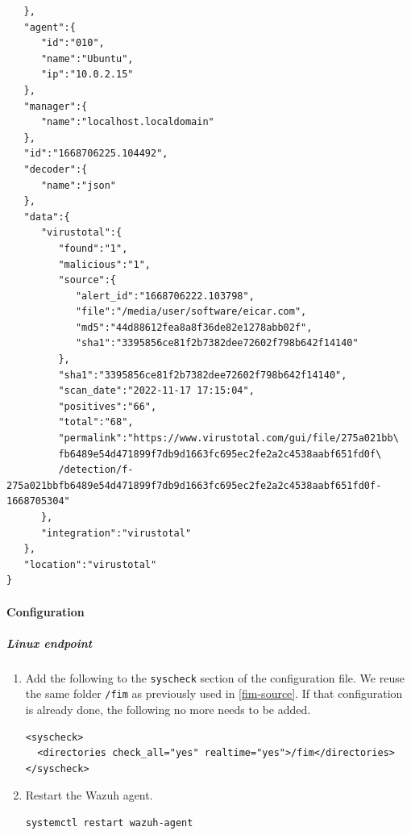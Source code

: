 \begin{enumerate}
\begin{itemize}
\begin{verbatim}
   },
   "agent":{
      "id":"010",
      "name":"Ubuntu",
      "ip":"10.0.2.15"
   },
   "manager":{
      "name":"localhost.localdomain"
   },
   "id":"1668706225.104492",
   "decoder":{
      "name":"json"
   },
   "data":{
      "virustotal":{
         "found":"1",
         "malicious":"1",
         "source":{
            "alert_id":"1668706222.103798",
            "file":"/media/user/software/eicar.com",
            "md5":"44d88612fea8a8f36de82e1278abb02f",
            "sha1":"3395856ce81f2b7382dee72602f798b642f14140"
         },
         "sha1":"3395856ce81f2b7382dee72602f798b642f14140",
         "scan_date":"2022-11-17 17:15:04",
         "positives":"66",
         "total":"68",
         "permalink":"https://www.virustotal.com/gui/file/275a021bb\
         fb6489e54d471899f7db9d1663fc695ec2fe2a2c4538aabf651fd0f\
         /detection/f-275a021bbfb6489e54d471899f7db9d1663fc695ec2fe2a2c4538aabf651fd0f-1668705304"
      },
      "integration":"virustotal"
   },
   "location":"virustotal"
}
    \end{verbatim}
    \end{itemize}
\end{enumerate}

\paragraph{Configuration}
\subparagraph{Linux endpoint}
\begin{enumerate}
    \item Add the following to the \texttt{\textlangle syscheck\textrangle} section of the configuration file. We reuse the same folder \texttt{/fim} as previously used in \ref{fim-source}. If that configuration is already done, the following no more needs to be added.
    \begin{verbatim}
<syscheck>
  <directories check_all="yes" realtime="yes">/fim</directories>
</syscheck>
    \end{verbatim}

    \item Restart the Wazuh agent.
    \begin{verbatim}
systemctl restart wazuh-agent
    \end{verbatim}
\end{enumerate}

